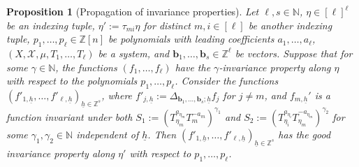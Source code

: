 \documentclass[11pt]{amsart}
\newtheorem{proposition}[lemma]{Proposition}
\theoremstyle{definition}
\newcommand{\N}{{\mathbb N}}
\newcommand{\Z}{{\mathbb Z}}
\newcommand{\CX}{{\mathcal X}}
\renewcommand{\b}{{\textbf{b}}}
\newcommand{\uh}{{\underline{h}}}
\newcommand{\brac}[1]{\mathopen{}\left( #1 \mathclose{}\right)}
\begin{document}

\begin{proposition}[Propagation of invariance properties]\label{propagation of invariance}
Let $\ell, s\in\N$, $\eta\in[\ell]^\ell$ be an indexing tuple, $\eta' := \tau_{mi}\eta$ for distinct $m,i\in[\ell]$ be another indexing tuple, $p_1, \ldots, p_\ell\in\Z[n]$ be polynomials with leading coefficients $a_1, \ldots, a_\ell$, $(X, \CX, \mu, T_1, \ldots, T_\ell)$ be a system, and $\b_1, \ldots,\b_s\in\Z^\ell$ be vectors. Suppose that for some $\gamma\in\N$, the functions $(f_1, \ldots, f_\ell)$ have the $\gamma$-invariance property along $\eta$ with respect to the polynomials $p_1, \ldots, p_\ell$. Consider the functions $(f'_{1, \uh}, \ldots, f'_{\ell, \uh})_{\uh \in \Z^s}$, where $f'_{j, \uh} := \Delta_{\b_1, \ldots, \b_s; \uh}f_j$ for $j\neq m$, and $f_{m, \uh}'$ is a function invariant under both
$S_1 :=\brac{T_{\eta_m}^{a_{\eta_m}}T_m^{-a_m}}^{\gamma_1}$ and $S_2 := \brac{T_{\eta_i}^{a_{\eta_i}}T_{\eta_m}^{-a_{\eta_m}}}^{\gamma_2}$ for some $\gamma_1, \gamma_2\in\N$ independent of $\uh$.
Then $(f'_{1, \uh}, \ldots, f'_{\ell, \uh})_{\uh \in \Z^s}$ has the good invariance property along $\eta'$ with respect to $p_1, \ldots, p_\ell$.
\end{proposition}
\end{document}
